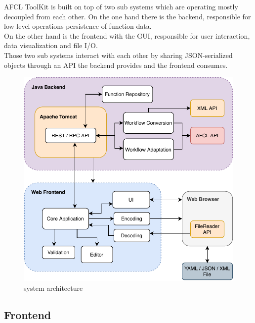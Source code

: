 \documentclass[a4paper,top=25mm,bottom=25mm,12pt,pdftex,halfparskip,twoside,bibtotoc,numbers=noenddot]{scrbook}
\begin{document}


AFCL ToolKit is built on top of two sub systems which are operating mostly decoupled from each other. On the one hand there is the backend, responsible for low-level operations persistence of function data.\\
On the other hand is the frontend with the GUI, responsible for user interaction, data visualization and file I/O.\\
Those two sub systems interact with each other by sharing JSON-serialized objects through an API the backend provides and the frontend consumes.


\begin{figure}[H]
  \centering
  \vspace{0.8cm}
  \includegraphics{architecture}
  \caption{system architecture}
\end{figure}

\subsection{Frontend}
\end{document}
